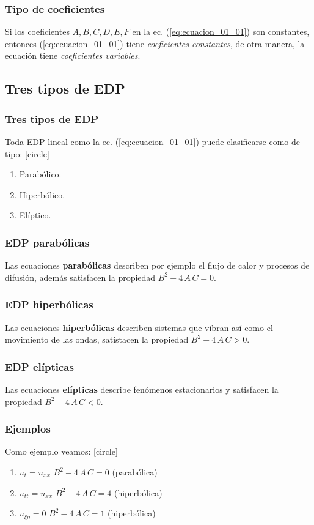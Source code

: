 \documentclass[12pt]{beamer}
\begin{document}
\begin{frame}
\frametitle{Tipo de coeficientes}
Si los coeficientes $A, B, C, D, E, F$ en la ec. (\ref{eq:ecuacion_01_01}) son constantes, entonces (\ref{eq:ecuacion_01_01}) tiene \emph{coeficientes constantes}, de otra manera, la ecuación tiene \emph{coeficientes variables}.
\end{frame}

\subsection{Tres tipos de EDP}

\begin{frame}
\frametitle{Tres tipos de EDP}
Toda EDP lineal como la ec. (\ref{eq:ecuacion_01_01}) puede clasificarse como de tipo:
[circle]
\begin{enumerate}[<+->]
\item Parabólico.
\item Hiperbólico.
\item Elíptico.
\end{enumerate}
\end{frame}
\begin{frame}
\frametitle{EDP parabólicas}
Las ecuaciones \textbf{parabólicas} describen por ejemplo el flujo de calor y procesos de difusión, además satisfacen la propiedad $B^{2} - 4 \, A \, C = 0$.
\end{frame}
\begin{frame}
\frametitle{EDP hiperbólicas}
Las ecuaciones \textbf{hiperbólicas} describen sistemas que vibran así como el movimiento de las ondas, satistacen la propiedad $B^{2} - 4 \, A \, C > 0$.
\end{frame}
\begin{frame}
\frametitle{EDP elípticas}
Las ecuaciones \textbf{elípticas} describe fenómenos estacionarios y satisfacen la propiedad $B^{2} - 4 \, A \, C < 0$.
\end{frame}
\begin{frame}
\frametitle{Ejemplos}
Como ejemplo veamos:
[circle]
\begin{enumerate}[<+->]
\setlength\itemsep{1em}
\item $u_{t} = u_{xx}$ \hspace{1cm} $B^{2} - 4 \, A \, C = 0$ \hspace{1cm} (parabólica)
\item $u_{tt} = u_{xx}$ \hspace{0.8cm} $B^{2} - 4 \, A \, C = 4$ \hspace{1cm} (hiperbólica)
\item $u_{\xi \eta} = 0$ \hspace{1cm} $B^{2} - 4 \, A \, C = 1$ \hspace{1cm} (hiperbólica)
\seti
\end{enumerate}
\end{frame}
\end{document}

